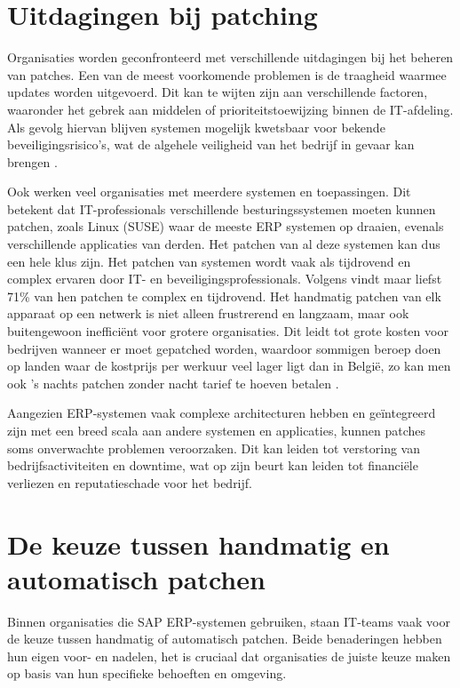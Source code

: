 \section{Uitdagingen bij patching}
Organisaties worden geconfronteerd met verschillende uitdagingen bij het beheren van patches. Een van de meest voorkomende problemen is de traagheid waarmee updates worden uitgevoerd. Dit kan te wijten zijn aan verschillende
factoren, waaronder het gebrek aan middelen of prioriteitstoewijzing binnen de IT-afdeling. Als gevolg hiervan blijven systemen mogelijk kwetsbaar
voor bekende beveiligingsrisico's, wat de algehele veiligheid van het bedrijf in gevaar kan brengen \autocite{AppMaster2023}. 

Ook werken veel organisaties met meerdere systemen en toepassingen. Dit betekent dat IT-professionals verschillende besturingssystemen moeten kunnen patchen, zoals Linux (SUSE) waar de meeste ERP systemen op draaien, evenals verschillende applicaties van derden.
Het patchen van al deze systemen kan dus een hele klus zijn. Het patchen van systemen wordt vaak als tijdrovend en complex ervaren door IT- en beveiligingsprofessionals. Volgens \textcite{ivanti2021} vindt maar liefst 71\% van hen patchen te complex en tijdrovend. Het handmatig patchen van elk apparaat op een netwerk is niet alleen frustrerend en langzaam, maar
ook buitengewoon inefficiënt voor grotere organisaties. Dit leidt tot grote kosten voor bedrijven wanneer er moet gepatched worden, waardoor sommigen beroep doen op landen waar de kostprijs per werkuur veel lager ligt dan in België, zo kan men ook 's nachts patchen zonder nacht tarief te hoeven betalen \autocite{Munck2024}. 

Aangezien ERP-systemen vaak complexe architecturen hebben en geïntegreerd zijn met een breed scala aan andere systemen en applicaties, kunnen patches soms onverwachte problemen veroorzaken. Dit kan leiden tot verstoring van bedrijfsactiviteiten 
en downtime, wat op zijn beurt kan leiden tot financiële verliezen en reputatieschade voor het bedrijf.


\section{De keuze tussen handmatig en automatisch patchen}

Binnen organisaties die SAP ERP-systemen gebruiken, staan IT-teams vaak voor de keuze tussen handmatig of automatisch patchen. Beide benaderingen hebben hun eigen voor- en nadelen, het is cruciaal dat organisaties de juiste keuze maken op basis van hun specifieke behoeften en omgeving.

